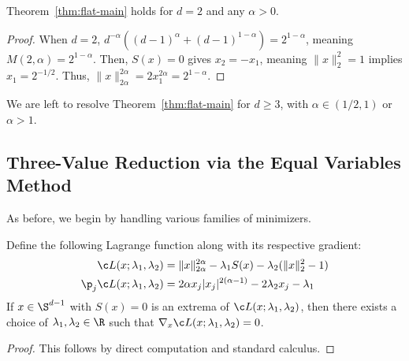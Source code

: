\documentclass[11pt]{article}
\begin{document}

\begin{lemma}\label{lemma:d<=2}
    Theorem~\ref{thm:flat-main} holds for $d= 2$ and any $\alpha >0$.
\end{lemma}
\begin{proof}
   When $d=2$, $d^{-\alpha}((d-1)^\alpha+(d-1)^{1-\alpha})=2^{1-\alpha}$, meaning $M(2,\alpha)=2^{1-\alpha}$. Then, $S(x)=0$ gives $x_2=-x_1$, meaning $\|x\|_2^2=1$ implies $x_1=2^{-1/2}$.
   Thus, $\|x\|_{2\alpha}^{2\alpha}=2x_1^{2\alpha}=2^{1-\alpha}$.
\end{proof}

We are left to resolve Theorem~\ref{thm:flat-main} for $d\geq 3$, with $\alpha \in (1/2,1)$ or $\alpha> 1$. 

\subsection{Three-Value Reduction via the Equal Variables Method}
As before, we begin by handling various families of minimizers. 
\begin{lemma}\label{lemma:flat-lagrange}
   Define the following Lagrange function along with its respective gradient:
   \begin{equation}
       \begin{aligned}
           \c L (x;\lambda_1,\lambda_2)&=\|x\|_{2\alpha}^{2\alpha}-\lambda_1S(x)-\lambda_2(\|x\|_2^2-1)\\
           \p_j \c L(x;\lambda_1,\lambda_2)&= 2\alpha x_j |x_j|^{2(\alpha-1)}-2\lambda_2 x_j-\lambda_1
       \end{aligned}
   \end{equation}
   If $x\in \S^{d-1}$ with $S(x)=0$ is an extrema of $\c L(x;\lambda_1,\lambda_2)$, then there exists a choice of $\lambda_1,\lambda_2\in \R $ such that $\nabla_x \c L(x;\lambda_1,\lambda_2)=0$.
\end{lemma}
\begin{proof}
    This follows by direct computation and standard calculus.
\end{proof}
\end{document}
